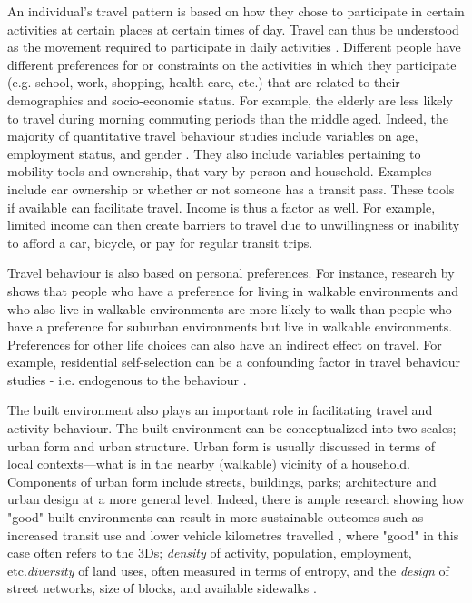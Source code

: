 An individual's travel pattern is based on how they chose to participate in certain activities at certain places at certain times of day. Travel can thus be understood as the movement required to participate in daily activities \cite{hanson_determinants_1982}. Different people have different preferences for or constraints on the activities in which they participate (e.g. school, work, shopping, health care, etc.) that are related to their demographics and socio-economic status. For example, the elderly are less likely to travel during morning commuting periods than the middle aged. Indeed, the majority of quantitative travel behaviour studies include variables on age, employment status, and gender \cite{hanson_determinants_1982}. They also include variables pertaining to mobility tools and ownership, that vary by person and household. Examples include car ownership or whether or not someone has a transit pass. These tools if available can facilitate travel. Income is thus a factor as well. For example, limited income can then create barriers to travel due to unwillingness or inability to afford a car, bicycle, or pay for regular transit trips.

Travel behaviour is also based on personal preferences. For instance, research by \cite{schwanen_what_2005} shows that people who have a preference for living in walkable environments and who also live in walkable environments are more likely to walk than people who have a preference for suburban environments but live in walkable environments. Preferences for other life choices can also have an indirect effect on travel. For example, residential self-selection can be a confounding factor in travel behaviour studies - i.e. endogenous to the behaviour \cite{cao_how_2016}.

The built environment also plays an important role in facilitating travel and activity behaviour. The built environment can be conceptualized into two scales; urban form and urban structure. Urban form is usually discussed in terms of local contexts---what is in the nearby (walkable) vicinity of a household. Components of urban form include streets, buildings, parks; architecture and urban design at a more general level. Indeed, there is ample research showing how "good" built environments can result in more sustainable outcomes such as increased transit use and lower vehicle kilometres travelled \cite{ewing_travel_2010,ewing_compactness_2015}, where "good" in this case often refers to the 3Ds; \textit{density} of activity, population, employment, etc.\textit{diversity} of land uses, often measured in terms of entropy, and the \textit{design} of street networks, size of blocks, and available sidewalks \cite{cervero_travel_1997}.

